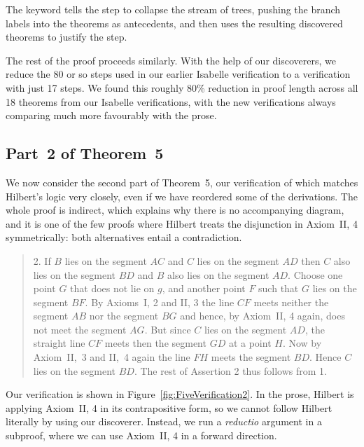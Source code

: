 \linebreak

The  keyword tells the step to collapse the stream of trees, pushing the branch labels into the theorems as antecedents, and then uses the resulting discovered theorems to justify the step.

The rest of the proof proceeds similarly. With the help of our discoverers, we reduce the 80 or so steps used in our earlier Isabelle verification to a verification with just 17 steps. We found this roughly 80\% reduction in proof length across all 18 theorems from our Isabelle verifications, with the new verifications always comparing much more favourably with the prose.

\subsection{Part~2 of Theorem~5}
We now consider the second part of Theorem~5, our verification of which matches Hilbert's logic very closely, even if we have reordered some of the derivations. The whole proof is indirect, which explains why there is no accompanying diagram, and it is one of the few proofs where Hilbert treats the disjunction in Axiom~II, 4 symmetrically: both alternatives entail a contradiction.

\begin{quote}2. If $B$ lies on the segment $AC$ and $C$ lies on the segment $AD$ then $C$ also lies on the segment $BD$ and $B$ also lies on the segment $AD$. Choose one point $G$ that does not lie on $g$, and another point $F$ such that $G$ lies on the segment $BF$. By Axioms~I, 2 and II, 3 the line $CF$ meets neither the segment $AB$ nor the segment $BG$ and hence, by Axiom~II, 4 again, does not meet the segment $AG$. But since $C$ lies on the segment $AD$, the straight line $CF$ meets then the segment $GD$ at a point $H$. Now by Axiom~II,~3 and II,~4 again the line $FH$ meets the segment $BD$. Hence $C$ lies on the segment $BD$. The rest of Assertion 2 thus follows from 1.
\end{quote}

Our verification is shown in Figure~\ref{fig:FiveVerification2}. In the prose, Hilbert is applying Axiom~II, 4 in its contrapositive form, so we cannot follow Hilbert literally by using our  discoverer. Instead, we run a \emph{reductio} argument in a subproof, where we can use Axiom~II, 4 in a forward direction.

